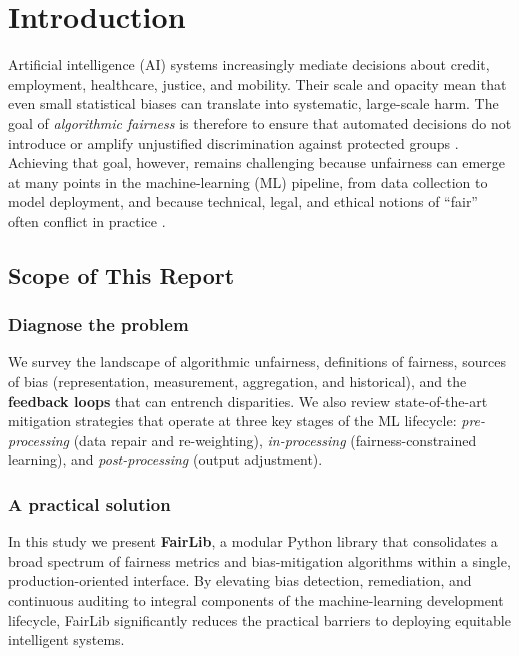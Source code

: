 \documentclass[12pt,a4paper,openright,twoside]{book}
\begin{document}
\tableofcontents   

\mainmatter

\chapter{Introduction}
\label{chap:introduction}
Artificial intelligence (AI) systems increasingly mediate decisions about
credit, employment, healthcare, justice, and mobility.  Their scale and
opacity mean that even small statistical biases can translate into
systematic, large-scale harm.  The goal of \emph{algorithmic fairness} is
therefore to ensure that automated decisions do not introduce or amplify unjustified discrimination against protected groups
\cite{mehrabi2021survey}.  Achieving that goal, however, remains
challenging because unfairness can emerge at many points in the
machine-learning (ML) pipeline, from data collection to model
deployment, and because technical, legal, and ethical notions of
“fair” often conflict in practice \cite{suresh2021framework}.

\section{Scope of This Report}
\subsection{Diagnose the problem}
We survey the landscape of algorithmic unfairness, definitions of
fairness, sources of bias (representation, measurement, aggregation,
and historical), and the \textbf{feedback loops} that can entrench disparities.
We also review state-of-the-art mitigation strategies that operate at
three key stages of the ML lifecycle:
\emph{pre-processing} (data repair and re-weighting),
\emph{in-processing} (fairness-constrained learning), and
\emph{post-processing} (output adjustment).

\subsection{A practical solution}
In this study we present \textbf{FairLib}, a modular Python library that consolidates a broad spectrum of fairness metrics and bias-mitigation algorithms within a single, production-oriented interface. By elevating bias detection, remediation, and continuous auditing to integral components of the machine-learning development lifecycle, FairLib significantly reduces the practical barriers to deploying equitable intelligent systems.
\end{document}
